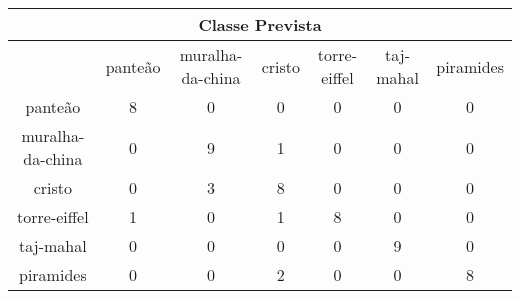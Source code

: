 \begin{tabular}{|c|c|c|c|c|c|c|}
\hline
\multicolumn{7}{|c|}{Classe Prevista}\\
\hline
 & panteão & muralha-da-china & cristo & torre-eiffel & taj-mahal & piramides\\
panteão & 8 & 0 & 0 & 0 & 0 & 0\\
muralha-da-china & 0 & 9 & 1 & 0 & 0 & 0\\
cristo & 0 & 3 & 8 & 0 & 0 & 0\\
torre-eiffel & 1 & 0 & 1 & 8 & 0 & 0\\
taj-mahal & 0 & 0 & 0 & 0 & 9 & 0\\
piramides & 0 & 0 & 2 & 0 & 0 & 8\\
\hline
\end{tabular}
